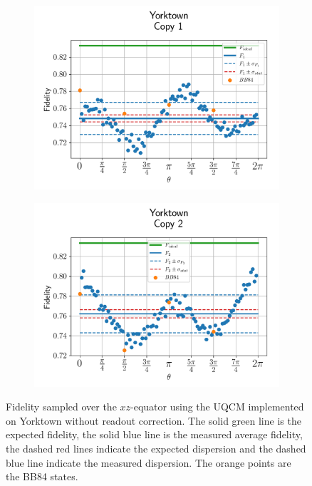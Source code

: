 \begin{figure}[H]
    \centering
    \begin{subfigure}{.45\textwidth}
      \centering
      \includegraphics[width=\textwidth]{Figures/UQCM/IBM/OnlyEquator/results_ibmqx2_copy1.png}
    \end{subfigure}%
    \begin{subfigure}{.45\textwidth}
      \centering
      \includegraphics[width=\textwidth]{Figures/UQCM/IBM/OnlyEquator/results_ibmqx2_copy2.png}
    \end{subfigure}
    \caption{Fidelity sampled over the $xz$-equator using the UQCM implemented on Yorktown without readout correction. The solid green line is the expected fidelity, the solid blue line is the measured average fidelity, the dashed red lines indicate the expected dispersion and the dashed blue line indicate the measured dispersion. The orange points are the BB84 states.}
\end{figure}

